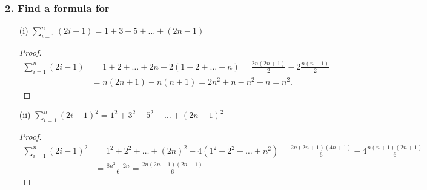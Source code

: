 \documentclass{article}
\begin{document}
\subsubsection*{2. Find a formula for}
\begin{enumerate}
	\item[(i)] $\sum^{n}_{i = 1}(2i - 1) = 1 + 3 + 5 + \dots + (2n - 1)$
	\begin{proof}
		\begin{align*}
			\sum^{n}_{i = 1}(2i - 1) &= 1 + 2 + \dots + 2n - 2(1 + 2 + \dots + n) = \frac{2n(2n + 1)}{2} - 2\frac{n(n+1)}{2} \\&= n(2n + 1) - n(n + 1) = 2n^2 + n - n^2 - n = n^2.
		\end{align*}
	\end{proof}
	\item[(ii)] $\sum^{n}_{i = 1}(2i - 1)^2 = 1^2 + 3^2 + 5^2 + \dots + (2n - 1)^2$
	\begin{proof}
		\begin{align*}
			\sum^{n}_{i = 1}(2i - 1)^2 &= 1^2 + 2^2 + \dots + (2n)^2 - 4(1^2 + 2^2 + \dots + n^2) = \frac{2n(2n + 1)(4n + 1)}{6} - 4\frac{n(n+1)(2n+1)}{6} \\&= \frac{8n^3 - 2n}{6} = \frac{2n(2n - 1)(2n + 1)}{6}
		\end{align*}
	\end{proof}
\end{enumerate}
\end{document}
